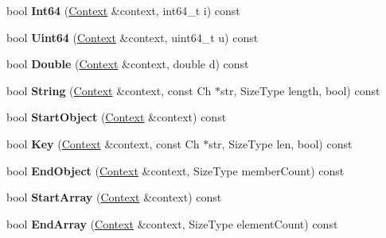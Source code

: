 \begin{DoxyCompactItemize}
\item 
bool {\bfseries Int64} (\hyperlink{structinternal_1_1_schema_validation_context}{Context} \&context, int64\+\_\+t i) const \hypertarget{classinternal_1_1_schema_a4aa9da1fd0cb4c19dcaaeebbc8abf1dc}{}\label{classinternal_1_1_schema_a4aa9da1fd0cb4c19dcaaeebbc8abf1dc}

\item 
bool {\bfseries Uint64} (\hyperlink{structinternal_1_1_schema_validation_context}{Context} \&context, uint64\+\_\+t u) const \hypertarget{classinternal_1_1_schema_afb862d9aee4bbe2aa99e0f44ec90b9d8}{}\label{classinternal_1_1_schema_afb862d9aee4bbe2aa99e0f44ec90b9d8}

\item 
bool {\bfseries Double} (\hyperlink{structinternal_1_1_schema_validation_context}{Context} \&context, double d) const \hypertarget{classinternal_1_1_schema_aaf4ff1cb84013ff1a82ecb59cac38bfe}{}\label{classinternal_1_1_schema_aaf4ff1cb84013ff1a82ecb59cac38bfe}

\item 
bool {\bfseries String} (\hyperlink{structinternal_1_1_schema_validation_context}{Context} \&context, const Ch $\ast$str, Size\+Type length, bool) const \hypertarget{classinternal_1_1_schema_a2bc7b83a75b84c241e733be9d356a2c4}{}\label{classinternal_1_1_schema_a2bc7b83a75b84c241e733be9d356a2c4}

\item 
bool {\bfseries Start\+Object} (\hyperlink{structinternal_1_1_schema_validation_context}{Context} \&context) const \hypertarget{classinternal_1_1_schema_a907b715d5f817d337a3e18759f3ac0e4}{}\label{classinternal_1_1_schema_a907b715d5f817d337a3e18759f3ac0e4}

\item 
bool {\bfseries Key} (\hyperlink{structinternal_1_1_schema_validation_context}{Context} \&context, const Ch $\ast$str, Size\+Type len, bool) const \hypertarget{classinternal_1_1_schema_af0855cd2ee33929513dd8b148bfa9017}{}\label{classinternal_1_1_schema_af0855cd2ee33929513dd8b148bfa9017}

\item 
bool {\bfseries End\+Object} (\hyperlink{structinternal_1_1_schema_validation_context}{Context} \&context, Size\+Type member\+Count) const \hypertarget{classinternal_1_1_schema_ac66720d141d8c811cb2c71da05509618}{}\label{classinternal_1_1_schema_ac66720d141d8c811cb2c71da05509618}

\item 
bool {\bfseries Start\+Array} (\hyperlink{structinternal_1_1_schema_validation_context}{Context} \&context) const \hypertarget{classinternal_1_1_schema_a6340166b92577ce0ef9b7735f66937ec}{}\label{classinternal_1_1_schema_a6340166b92577ce0ef9b7735f66937ec}

\item 
bool {\bfseries End\+Array} (\hyperlink{structinternal_1_1_schema_validation_context}{Context} \&context, Size\+Type element\+Count) const \hypertarget{classinternal_1_1_schema_a58101f966bd7e51086d456b3d84653eb}{}\label{classinternal_1_1_schema_a58101f966bd7e51086d456b3d84653eb}

\end{DoxyCompactItemize}
